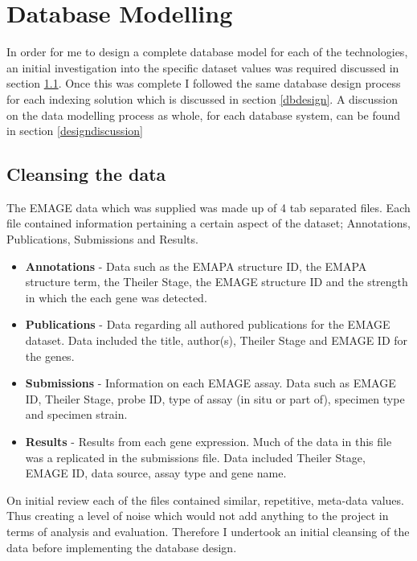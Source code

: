 \chapter{Database Modelling}\label{design}

In order for me to design a complete database model for each of the technologies, an initial investigation into the specific dataset values was required discussed in section \ref{datasetvalues}. Once this was complete I followed the same database design process for each indexing solution which is discussed in section \ref{dbdesign}. A discussion on the data modelling process as whole, for each database system, can be found in section \ref{designdiscussion}

\section{Cleansing the data}\label{datasetvalues}

The EMAGE data which was supplied was made up of 4 tab separated files. Each file contained information pertaining a certain aspect of the dataset; Annotations, Publications, Submissions and Results.

\begin{itemize}
\item \textbf{Annotations} - Data such as the EMAPA structure ID, the EMAPA structure term, the Theiler Stage, the EMAGE structure ID and the strength in which the each gene was detected.

\item \textbf{Publications} - Data regarding all authored publications for the EMAGE dataset. Data included the title, author(s), Theiler Stage and EMAGE ID for the genes.

\item \textbf{Submissions} - Information on each EMAGE assay. Data such as EMAGE ID, Theiler Stage, probe ID, type of assay (in situ or part of), specimen type and specimen strain.

\item \textbf{Results} - Results from each gene expression. Much of the data in this file was a replicated in the submissions file. Data included Theiler Stage, EMAGE ID, data source, assay type and gene name.
\end{itemize}

On initial review each of the files contained similar, repetitive, meta-data values. Thus creating a level of noise which would not add anything to the project in terms of analysis and evaluation. Therefore I undertook an initial cleansing of the data before implementing the database design.

